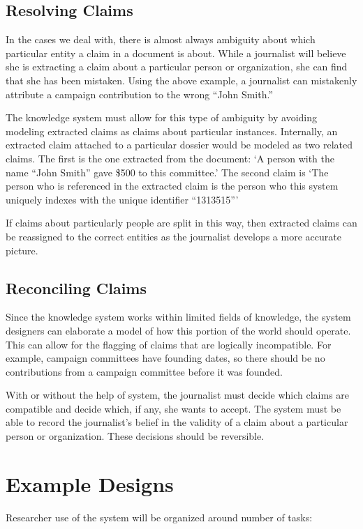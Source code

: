 \documentclass[format=siggraph, review=true]{acmart}
\begin{document}
\subsection{Resolving Claims}
In the cases we deal with, there is almost always ambiguity about
which particular entity a claim in a document is about. While a
journalist will believe she is extracting a claim about a particular
person or organization, she can find that she has been
mistaken. Using the above example, a journalist can mistakenly
attribute a campaign contribution to the wrong ``John Smith.''

The knowledge system must allow for this type of ambiguity by avoiding
modeling extracted claims as claims about particular
instances. Internally, an extracted claim attached to a particular
dossier would be modeled as two related claims. The first is the one
extracted from the document: `A person with the name ``John Smith''
gave \$500 to this committee.' The second claim is `The person who is
referenced in the extracted claim is the person who this system
uniquely indexes with the unique identifier ``1313515'''

If claims about particularly people are split in this way, then
extracted claims can be reassigned to the correct entities as the
journalist develops a more accurate picture.


\subsection{Reconciling Claims}
Since the knowledge system works within limited fields of knowledge,
the system designers can elaborate a model of how this portion of
the world should operate. This can allow for the flagging of claims
that are logically incompatible. For example, campaign committees have
founding dates, so there should be no contributions from a campaign
committee before it was founded. 

With or without the help of system, the journalist must decide which
claims are compatible and decide which, if any, she wants to
accept. The system must be able to record the journalist's belief in
the validity of a claim about a particular person or
organization. These decisions should be reversible.

\section{Example Designs}
Researcher use of the system will be organized around number of tasks:
\end{document}
